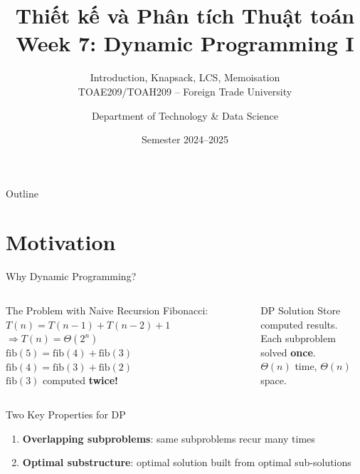 \documentclass[aspectratio=169,xcolor=dvipsnames]{beamer}
\title[Algorithms -- Week 7]{\textbf{Thiết kế và Phân tích Thuật toán}\\
  \large Week 7: Dynamic Programming I}
\subtitle{Introduction, Knapsack, LCS, Memoisation \\ TOAE209/TOAH209 -- Foreign Trade University}
\author{Department of Technology \& Data Science}
\date{Semester 2024--2025}
\begin{document}
\begin{frame}\titlepage\end{frame}
\begin{frame}{Outline}\tableofcontents\end{frame}

\section{Motivation}
\begin{frame}{Why Dynamic Programming?}
  \begin{columns}
    \begin{alertblock}{The Problem with Naive Recursion}
      Fibonacci: $T(n) = T(n-1)+T(n-2)+1$\\
      $\Rightarrow T(n) = \Theta(2^n)$\\[4pt]
      $\text{fib}(5) = \text{fib}(4)+\text{fib}(3)$\\
      $\text{fib}(4) = \text{fib}(3)+\text{fib}(2)$\\
      $\text{fib}(3)$ computed \textbf{twice!}
    \end{alertblock}
    \begin{exampleblock}{DP Solution}
      Store computed results.\\
      Each subproblem solved \textbf{once}.\\
      $\Theta(n)$ time, $\Theta(n)$ space.
    \end{exampleblock}
  \end{columns}
  \vspace{0.5em}
  \begin{block}{Two Key Properties for DP}
    \begin{enumerate}
      \item \textbf{Overlapping subproblems}: same subproblems recur many times
      \item \textbf{Optimal substructure}: optimal solution built from optimal sub-solutions
    \end{enumerate}
  \end{block}
\end{frame}
\end{document}
